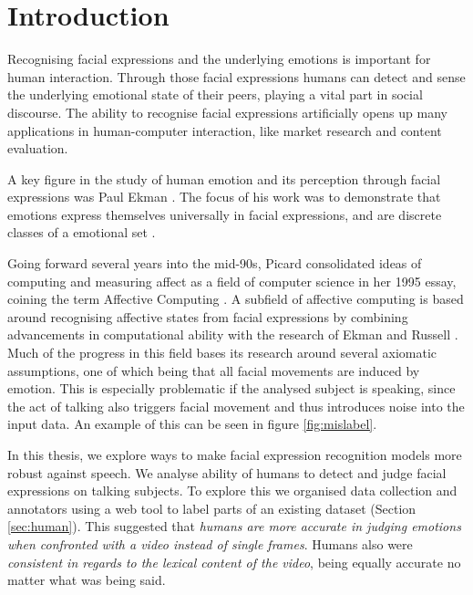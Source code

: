 \section{Introduction}

Recognising facial expressions and the underlying emotions is important for human interaction. Through those facial expressions humans can detect and sense the underlying emotional state of their peers, playing a vital part in social discourse. The ability to recognise facial expressions artificially opens up many applications in human-computer interaction, like market research and content evaluation.

A key figure in the study of human emotion and its perception through facial expressions was Paul Ekman \cite{ekman1987universals} \cite{ekman1992basic} \cite{ekman2013emotion}. The focus of his work was to demonstrate that emotions express themselves universally in facial expressions, and are discrete classes of a emotional set \cite{ekman1987universals}.

Going forward several years into the mid-90s, Picard consolidated ideas of computing and measuring affect as a field of computer science in her 1995 essay, coining the term Affective Computing \cite{picard2000affective}. A subfield of affective computing is based around recognising affective states from facial expressions by combining advancements in computational ability with the research of Ekman \cite{ekman1987universals} \cite{friesen1978facial} and Russell \cite{russell1980circumplex}. Much of the progress in this field bases its research around several axiomatic assumptions, one of which being that all facial movements are induced by emotion. This is especially problematic if the analysed subject is speaking, since the act of talking also triggers facial movement and thus introduces noise into the input data. An example of this can be seen in figure \ref{fig:mislabel}. 

In this thesis, we explore ways to make facial expression recognition models more robust against speech. We analyse ability of humans to detect and judge facial expressions on talking subjects. To explore this we organised data collection and annotators using a web tool to label parts of an existing dataset (Section \ref{sec:human}). This suggested that \textit{humans are more accurate in judging emotions when confronted with a video instead of single frames}. Humans also were \textit{consistent in regards to the lexical content of the video}, being equally accurate no matter what was being said.

